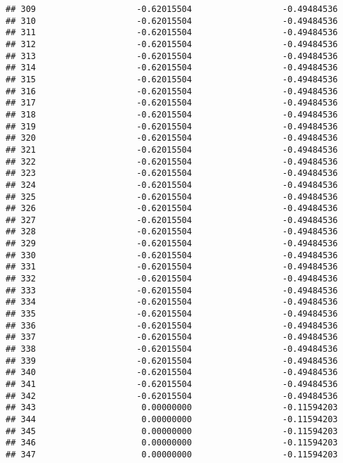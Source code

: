 \documentclass[]{article}
\begin{document}
\begin{verbatim}
## 309                    -0.62015504                  -0.49484536
## 310                    -0.62015504                  -0.49484536
## 311                    -0.62015504                  -0.49484536
## 312                    -0.62015504                  -0.49484536
## 313                    -0.62015504                  -0.49484536
## 314                    -0.62015504                  -0.49484536
## 315                    -0.62015504                  -0.49484536
## 316                    -0.62015504                  -0.49484536
## 317                    -0.62015504                  -0.49484536
## 318                    -0.62015504                  -0.49484536
## 319                    -0.62015504                  -0.49484536
## 320                    -0.62015504                  -0.49484536
## 321                    -0.62015504                  -0.49484536
## 322                    -0.62015504                  -0.49484536
## 323                    -0.62015504                  -0.49484536
## 324                    -0.62015504                  -0.49484536
## 325                    -0.62015504                  -0.49484536
## 326                    -0.62015504                  -0.49484536
## 327                    -0.62015504                  -0.49484536
## 328                    -0.62015504                  -0.49484536
## 329                    -0.62015504                  -0.49484536
## 330                    -0.62015504                  -0.49484536
## 331                    -0.62015504                  -0.49484536
## 332                    -0.62015504                  -0.49484536
## 333                    -0.62015504                  -0.49484536
## 334                    -0.62015504                  -0.49484536
## 335                    -0.62015504                  -0.49484536
## 336                    -0.62015504                  -0.49484536
## 337                    -0.62015504                  -0.49484536
## 338                    -0.62015504                  -0.49484536
## 339                    -0.62015504                  -0.49484536
## 340                    -0.62015504                  -0.49484536
## 341                    -0.62015504                  -0.49484536
## 342                    -0.62015504                  -0.49484536
## 343                     0.00000000                  -0.11594203
## 344                     0.00000000                  -0.11594203
## 345                     0.00000000                  -0.11594203
## 346                     0.00000000                  -0.11594203
## 347                     0.00000000                  -0.11594203

\end{verbatim}
\end{document}
